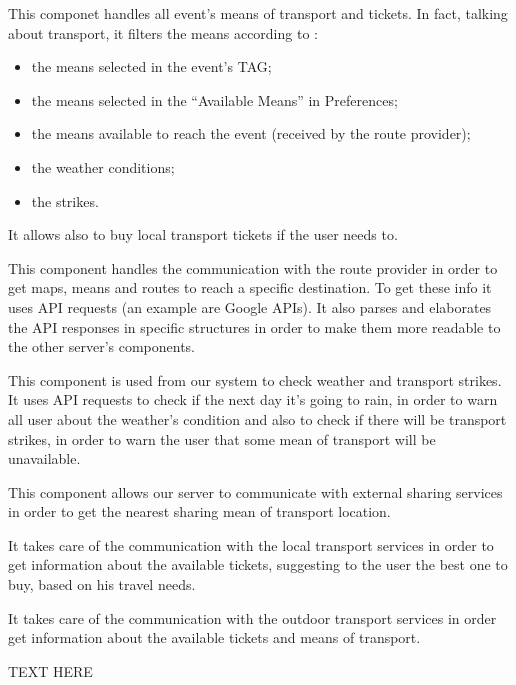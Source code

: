 This componet handles all event’s means of transport and tickets. In fact, talking about transport, it filters the means according to :
\begin{itemize}
	\setlength{\leftskip}{1cm}
	\item the means selected in the event’s TAG;
	\item the means selected in the “Available Means” in Preferences;
	\item the means available to reach the event (received by the route provider);
	\item the weather conditions;
	\item the strikes.
\end{itemize}
It allows also to buy local transport tickets if the user needs to. 

This component handles the communication with the route provider in order to get maps, means and routes to reach a specific destination. To get these info it uses API requests (an example are Google APIs).
It also parses and elaborates the API responses in specific structures in order to make them more readable to the other server’s components.

This component is used from our system to check weather and transport strikes.
It uses API requests to check if the next day it's going to rain, in order to warn all user about the weather's condition and also to check if there will be transport strikes, in order to warn the user that some mean of transport will be unavailable.

This component allows our server to communicate with external sharing services in order to get the nearest sharing mean of transport location.

It takes care of the communication with the local transport services in order to get information about the available tickets, suggesting to the user the best one to buy, based on his travel needs.

It takes care of the communication with the outdoor transport services in order get information about the available tickets and means of transport.


TEXT HERE


